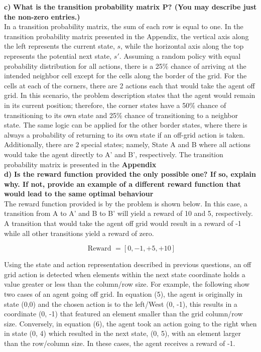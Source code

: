 \documentclass[11pt]{article}
\begin{document}
\noindent
\textbf{c)}
\noindent
\textbf{What is the transition probability matrix P? (You may describe just
the non-zero entries.)}
\\

\noindent
In a transition probability matrix, the sum of each row is equal to one. In the
transition probability matrix presented in the Appendix, the vertical axis along
the left represents the current state, $s$, while the horizontal axis along the
top represents the potential next state, $s'$. Assuming a random policy with
equal probability distribution for all actions, there is a 25\% chance of
arriving at the intended neighbor cell except for the cells along the border of
the grid. For the cells at each of the corners, there are 2 actions each that
would take the agent off grid. In this scenario, the problem description states
that the agent would remain in its current position; therefore, the corner
states have a 50\% chance of transitioning to its own state and 25\% chance of
transitioning to a neighbor state. The same logic can be applied for the other
border states, where there is always a probability of returning to its own state
if an off-grid action is taken. Additionally, there are 2 special states;
namely, State A and B where all actions would take the agent directly to A' and
B', respectively. The transition probability matrix is presented in the
\textbf{Appendix} \\

\noindent
\textbf{d)}
\noindent
\textbf{Is the reward function provided the only possible one? If so, explain
why. If not, provide an example of a different reward function that would lead
to the same optimal behaviour}
\\

\noindent
The reward function provided is by the problem is shown below. In this case, a
transition from A to A' and B to B' will yield a reward of 10 and 5,
respectively. A transition that would take the agent off grid would result in a
reward of -1 while all other transitions yield a reward of zero. 

\begin{equation}
\text { Reward }={[0,-1,+5,+10]}
\end{equation}

\noindent
Using the state and action representation described in previous questions, an
off grid action is detected when elements within the next state coordinate holds
a value greater or less than the column/row size. For example, the following
show two cases of an agent going off grid. In equation (5), the agent is
originally in state (0,0) and the chosen action is to the left/West (0, -1),
this results in a coordinate (0, -1) that featured an element smaller than the
grid column/row size. Conversely, in equation (6), the agent took an action
going to the right when in state (0, 4) which resulted in the next state, (0,
5), with an element larger than the row/column size. In these cases, the agent
receives a reward of -1.\\
\end{document}
